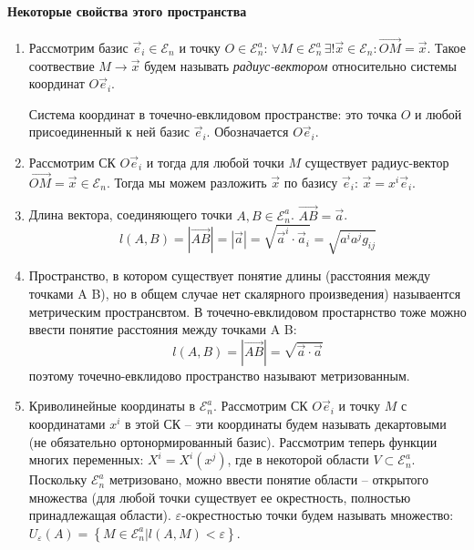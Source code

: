 \paragraph{Некоторые свойства этого пространства}
\begin{enumerate}
  \item Рассмотрим базис $\vec{e}_i \in \mathcal{E}_n$ и точку $O \in \mathcal{E}_n^a$:
    $\forall M \in \mathcal{E}_n^a \, \exists! \vec{x} \in \mathcal{E}_n : \vec{OM} = \vec{x}$.
    Такое соотвествие $M \to \vec{x}$ будем называть \emph{радиус-вектором} относительно системы координат $O\vec{e}_i$.
    \begin{definition}
      Система координат в точечно-евклидовом пространстве: это точка $O$ и любой присоединенный к ней
      базис $\vec{e}_i$. Обозначается $O\vec{e}_i$.
    \end{definition}
   
  \item Рассмотрим СК $O\vec{e}_i$ и тогда для любой точки $M$ существует радиус-вектор $\vec{OM} = \vec{x} \in \mathcal{E}_n$.
    Тогда мы можем разложить $\vec{x}$ по базису $\vec{e}_i$: $\vec{x} = x^i \vec{e}_i$.

  \item Длина вектора, соединяющего точки $A, B \in \mathcal{E}_n^a$. $\vec{AB} = \vec{a}$.
    \[
      l(A, B) = |\vec{AB}| = |\vec{a}| = \sqrt{\vec{a}^i \cdot \vec{a}_i} = \sqrt{a^i a^j g_{ij}}
    \]

  \item Пространство, в котором существует понятие длины (расстояния между точками A B), но в
    общем случае нет скалярного произведения) называентся метрическим пространсвтом.
    В точечно-евклидовом простарнство тоже можно ввести понятие расстояния между точками A B:
    \[
      l(A, B) = |\vec{AB}| = \sqrt{\vec{a} \cdot \vec{a}}
    \]
    поэтому точечно-евклидово пространство называют метризованным.

  \item Криволинейные координаты в $\mathcal{E}_n^a$. Рассмотрим СК $O\vec{e}_i$ и точку $M$ с
    координатами $x^i$ в этой СК -- эти координаты будем называть декартовыми (не обязательно
    ортонормированный базис).
    Рассмотрим теперь функции многих переменных: $X^i = X^i (x^j)$, где в некоторой области
    $V \subset \mathcal{E}_n^a$. Поскольку $\mathcal{E}_n^a$ метризовано, можно ввести понятие 
    области -- открытого множества (для любой точки существует ее окрестность, полностью
    принадлежащая области). $\varepsilon$-окрестностью точки будем называть множество:
    $U_\varepsilon(A) = \left\{ M \in \mathcal{E}_n^a | l(A, M) < \varepsilon \right\} $.
    

\end{enumerate}
